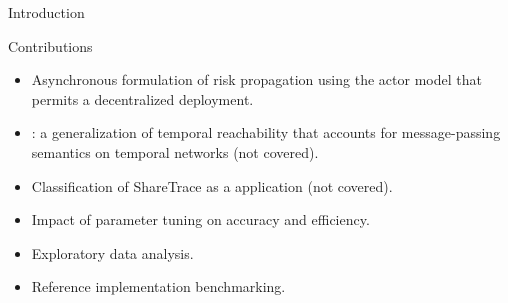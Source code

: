 \documentclass[11pt]{beamer}
\begin{document}
\begin{section}{Introduction}
\begin{frame}{Contributions}
\begin{itemize}
  \item Asynchronous formulation of risk propagation using the actor model that permits a decentralized deployment.
  \pause
  \item {}: a generalization of temporal reachability that accounts for message-passing semantics on temporal networks (not covered).
  \pause
  \item Classification of ShareTrace as a  application (not covered).
  \pause
  \item Impact of parameter tuning on accuracy and efficiency.
  \pause
  \item Exploratory data analysis.
  \pause
  \item Reference implementation benchmarking.
\end{itemize}
\end{frame}


\end{section}
\end{document}
